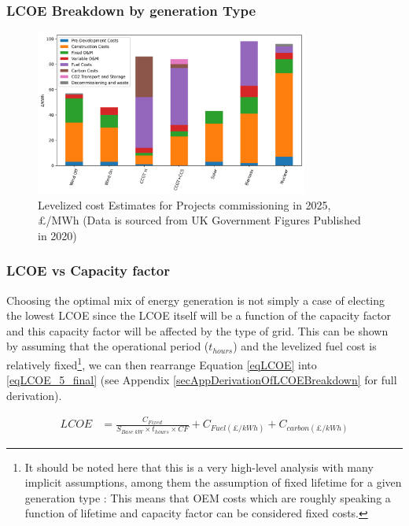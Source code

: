 \documentclass[11pt]{article}
\numberwithin{equation}{section}
\begin{document}
\subsubsection{LCOE Breakdown by generation Type \label{LCOEBreakdown}}
\label{sec:orga005442}
\begin{figure}[H]
\centering
\includegraphics[width=0.8\textwidth]{./.ob-jupyter/8db2ae3ea8d23f67cdfb46f0d78029d25fe124bc.png}
\caption{\label{figLCOEbreakdown}Levelized cost Estimates for Projects commissioning in 2025, £/MWh (Data is sourced from UK Government Figures Published in 2020\cite{DeptEnerLCOE})}
\end{figure}

\subsubsection{LCOE vs Capacity factor \label{secLCOEvsCF}}
\label{sec:org647649d}
Choosing the optimal mix of energy generation is not simply a case of electing the lowest LCOE since the LCOE itself will be a function of the capacity factor and this capacity factor will be affected by the type of grid. This can be shown by assuming that the operational period (\(t_{hours}\)) and the levelized fuel cost is relatively fixed\footnote{It should be noted here that this is a very high-level analysis with many implicit assumptions, among them the assumption of fixed lifetime for a given generation type : This means that OEM costs which are roughly speaking a function of lifetime and capacity factor can be considered fixed costs.}, we can then rearrange Equation \ref{eqLCOE} into \ref{eqLCOE_5_final} (see Appendix \ref{secAppDerivationOfLCOEBreakdown} for full derivation).

\begin{align}
\label{eqLCOE_5_final}
LCOE &= \frac{C_{Fixed}}{S_{Base\; kW} \times t_{hours}\times CF}+ C_{Fuel(\pounds/kWh)} + C_{carbon(\pounds/kWh)}
\end{align}
\end{document}
